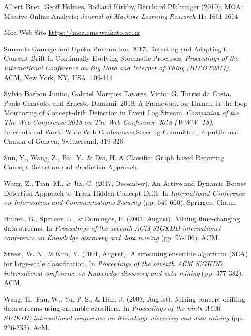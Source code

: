 % 

\begin{thebibliography}{99}


	\emph{} Albert Bifet, Geoff Holmes, Richard Kirkby, Bernhard Pfahringer (2010); MOA: Massive Online Analysis; \textit{Journal of Machine Learning Research} 11: 1601-1604 

	\emph{} Moa Web Site \url{https://moa.cms.waikato.ac.nz}





	\emph{}Sunanda Gamage and Upeka Premaratne. 2017. Detecting and Adapting to Concept Drift in Continually Evolving Stochastic Processes. \textit{Proceedings of the International Conference on Big Data and Internet of Thing (BDIOT2017)}. ACM, New York, NY, USA, 109-114
	
	\emph{}Sylvio Barbon Junior, Gabriel Marques Tavares, Victor G. Turrisi da Costa, Paolo Ceravolo, and Ernesto Damiani. 2018. A Framework for Human-in-the-loop Monitoring of Concept-drift Detection in Event Log Stream. \textit{Companion of the The Web Conference 2018 on The Web Conference 2018 (WWW '18)}. International World Wide Web Conferences Steering Committee, Republic and Canton of Geneva, Switzerland, 319-326.

	\emph{}Sun, Y., Wang, Z., Bai, Y., \& Dai, H. A Classifier Graph based Recurring Concept Detection and Prediction Approach.
	
	\emph{}Wang, Z., Tian, M., \& Jia, C. (2017, December). An Active and Dynamic Botnet Detection Approach to Track Hidden Concept Drift. In \textit{International Conference on Information and Communications Security} (pp. 646-660). Springer, Cham.
	
	\emph{}Hulten, G., Spencer, L., \& Domingos, P. (2001, August). Mining time-changing data streams. In \textit{Proceedings of the seventh ACM SIGKDD international conference on Knowledge discovery and data mining} (pp. 97-106). ACM.	
	
	\emph{}Street, W. N., \& Kim, Y. (2001, August). A streaming ensemble algorithm (SEA) for large-scale classification. In \textit{Proceedings of the seventh ACM SIGKDD international conference on Knowledge discovery and data mining} (pp. 377-382). ACM.	
	
	
	\emph{}Wang, H., Fan, W., Yu, P. S., \& Han, J. (2003, August). Mining concept-drifting data streams using ensemble classifiers. In \textit{Proceedings of the ninth ACM SIGKDD international conference on Knowledge discovery and data mining} (pp. 226-235). AcM.	
		
	
\end{thebibliography}

